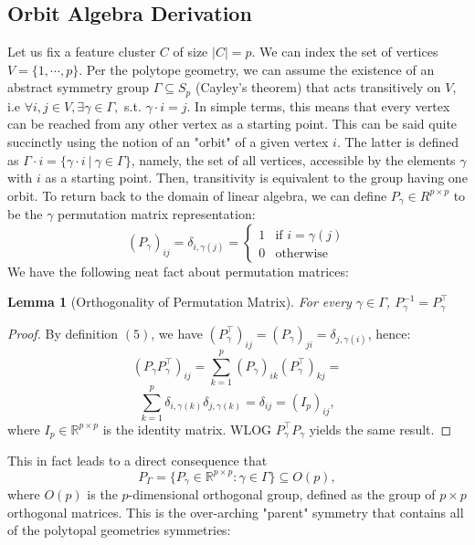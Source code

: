 \documentclass{article}
\theoremstyle{plain}
\newtheorem{lemma}{Lemma}[section]
\numberwithin{equation}{section}
\theoremstyle{definition}
\theoremstyle{remark}
\begin{document}
\subsection{Orbit Algebra Derivation}
\label{appendix:orbit}
Let us fix a feature cluster $C$ of size $|C|=p$. We can index the set of vertices $V = \{1, \cdots, p\}$. Per the polytope geometry, we can assume the existence of an abstract symmetry group $\Gamma \subseteq S_p$ (Cayley's theorem) that acts transitively on $V$, i.e $\forall i, j\in V, \exists \gamma\in\Gamma, $ s.t. $\gamma\cdot i = j$. In simple terms, this means that every vertex can be reached from any other vertex as a starting point. This can be said quite succinctly using the notion of an "orbit" of a given vertex $i$. The latter is defined as $\Gamma \cdot i = \{\gamma \cdot i \ |\ \gamma\in \Gamma\}$, namely, the set of all vertices, accessible by the elements $\gamma$ with $i$ as a starting point. Then, transitivity is equivalent to the group having one orbit. To return back to the domain of linear algebra, we can define $P_\gamma\in R^{p\times p}$ to be the $\gamma$ permutation matrix representation: 
\begin{equation}
(P_\gamma)_{ij} = \delta_{i, \gamma(j)} = \left\{\begin{matrix}
1 & \text{if }i=\gamma(j)\\ 0 &\text{otherwise}
\end{matrix}\right.\end{equation}
We have the following neat fact about permutation matrices: 
\begin{lemmaproofbox}
\begin{lemma}[Orthogonality of Permutation Matrix] For every $\gamma\in \Gamma$, $P_\gamma^{-1} = P_\gamma^\top$
\end{lemma}\label{lemma:A.1}
\begin{proof} By definition $(5)$, we have $(P_\gamma^\top)_{ij} = (P_\gamma)_{ji} = \delta_{j, \gamma(i)}$, hence:
$$(P_\gamma P_\gamma^\top)_{ij} = \sum_{k=1}^p (P_\gamma)_{ik} (P_\gamma^\top)_{kj} = $$
$$\sum_{k=1}^p \delta_{i, \gamma(k)}\delta _{j, \gamma(k)} = \delta_{ij}  = (I_p)_{ij},$$
where $I_p\in \mathbb{R}^{p\times p}$ is the identity matrix. WLOG $P_\gamma^\top P_\gamma$ yields the same result. \end{proof}
\end{lemmaproofbox}
\noindent This in fact leads to a direct consequence that $$P_\Gamma = \{P_\gamma\in \mathbb{R}^{p\times p} : \gamma\in \Gamma\}\subseteq O(p),$$
where $O(p)$ is the $p$-dimensional orthogonal group, defined as the group of $p\times p$ orthogonal matrices. This is the over-arching "parent" symmetry that contains all of the polytopal geometries symmetries:
\end{document}
